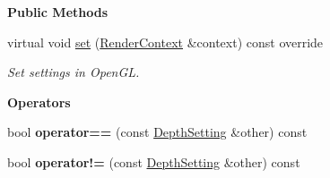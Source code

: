 \begin{Indent}\textbf{ Public Methods}\par
\begin{DoxyCompactItemize}
\item 
\mbox{\label{classrev_1_1_depth_setting_ab887dd07b36dfbe9bbc186ccf6c8a1d4}} 
virtual void \mbox{\hyperlink{classrev_1_1_depth_setting_ab887dd07b36dfbe9bbc186ccf6c8a1d4}{set}} (\mbox{\hyperlink{classrev_1_1_render_context}{Render\+Context}} \&context) const override
\begin{DoxyCompactList}\small\item\em Set settings in Open\+GL. \end{DoxyCompactList}\end{DoxyCompactItemize}
\end{Indent}
\begin{Indent}\textbf{ Operators}\par
\begin{DoxyCompactItemize}
\item 
\mbox{\label{classrev_1_1_depth_setting_a5c782a0d78bcc61d6fad0f26bf898e09}} 
bool {\bfseries operator==} (const \mbox{\hyperlink{classrev_1_1_depth_setting}{Depth\+Setting}} \&other) const
\item 
\mbox{\label{classrev_1_1_depth_setting_a1558f9b525b8a25e4efc7ed0a1d8e85c}} 
bool {\bfseries operator!=} (const \mbox{\hyperlink{classrev_1_1_depth_setting}{Depth\+Setting}} \&other) const
\end{DoxyCompactItemize}
\end{Indent}
